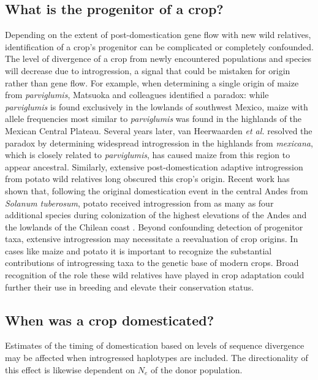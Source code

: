 \documentclass[11pt]{article}
\begin{document}
\subsection*{What is the progenitor of a crop?}
Depending on the extent of post-domestication gene flow with new wild relatives, identification of a crop's progenitor can be complicated or completely confounded.
The level of divergence of a crop from newly encountered populations and species will decrease due to introgression, a signal that could be mistaken for origin rather than gene flow.
For example, when determining a single origin of maize from \emph{parviglumis}, Matsuoka and colleagues \cite{matsuoka2002single} identified a paradox: while \emph{parviglumis} is found exclusively in the lowlands of southwest Mexico, maize with allele frequencies most similar to \emph{parviglumis} was found in the highlands of the Mexican Central Plateau.
Several years later, van Heerwaarden \emph{et al.} \cite{vanHeerwaarden2011} resolved the paradox by determining widespread introgression in the highlands from \emph{mexicana}, which is closely related to \emph{parviglumis}, has caused maize from this region to appear ancestral.
Similarly, extensive post-domestication adaptive introgression from  potato wild relatives long obscured this crop's origin.
Recent work has shown that, following the original domestication event in the central Andes from \emph{Solanum tuberosum}, potato received introgression from as many as four additional species during colonization of the highest elevations of the Andes and the lowlands of the Chilean coast \cite{Spooner2014, Gavrilenko2013}.
Beyond confounding detection of progenitor taxa, extensive introgression may necessitate a reevaluation of crop origins.
In cases like maize and potato it is important to recognize the substantial contributions of introgressing taxa to the genetic base of modern crops.
Broad recognition of the role these wild relatives have played in crop adaptation could further their use in breeding and elevate their conservation status.

\subsection*{When was a crop domesticated?}
Estimates of the timing of domestication based on levels of sequence divergence may be affected when introgressed haplotypes are included.
The directionality of this effect is likewise dependent on $N_e$ of the donor population.
\end{document}
